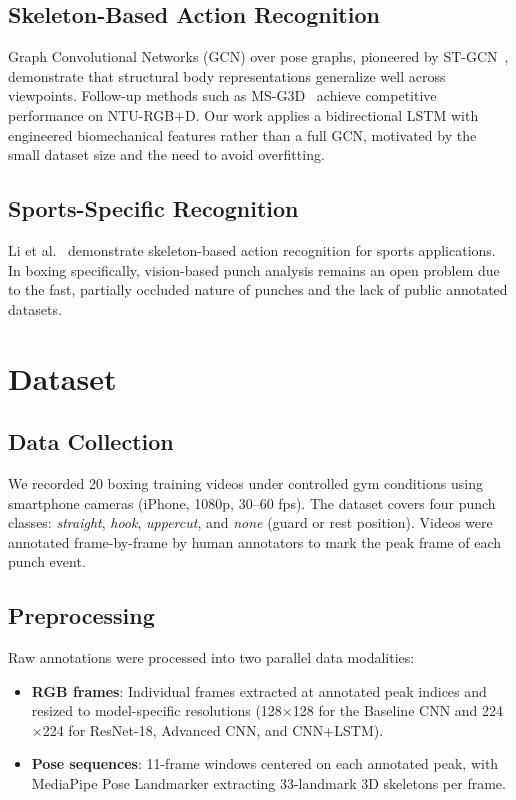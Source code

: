 \documentclass[conference]{IEEEtran}
\begin{document}
\subsection{Skeleton-Based Action Recognition}
Graph Convolutional Networks (GCN) over pose graphs, pioneered by
ST-GCN~\cite{yan2018spatial}, demonstrate that structural body
representations generalize well across viewpoints. Follow-up methods such as
MS-G3D~\cite{liu2020disentangling} achieve competitive performance on
NTU-RGB+D. Our work applies a bidirectional LSTM with engineered
biomechanical features rather than a full GCN, motivated by the small dataset
size and the need to avoid overfitting.

\subsection{Sports-Specific Recognition}
Li et al.~\cite{li2018skeleton} demonstrate skeleton-based action recognition
for sports applications. In boxing specifically, vision-based punch analysis
remains an open problem due to the fast, partially occluded nature of punches
and the lack of public annotated datasets.

\section{Dataset}

\subsection{Data Collection}
We recorded 20 boxing training videos under controlled gym conditions using
smartphone cameras (iPhone, 1080p, 30--60 fps). The dataset covers four punch
classes: \textit{straight}, \textit{hook}, \textit{uppercut}, and
\textit{none} (guard or rest position). Videos were annotated frame-by-frame
by human annotators to mark the peak frame of each punch event.

\subsection{Preprocessing}
Raw annotations were processed into two parallel data modalities:
\begin{itemize}
    \item \textbf{RGB frames}: Individual frames extracted at annotated peak
    indices and resized to model-specific resolutions (128$\times$128 for the
    Baseline CNN and 224$\times$224 for ResNet-18, Advanced CNN, and
    CNN+LSTM).
    \item \textbf{Pose sequences}: 11-frame windows centered on each annotated
    peak, with MediaPipe Pose Landmarker extracting 33-landmark 3D skeletons
    per frame.
\end{itemize}
\end{document}
